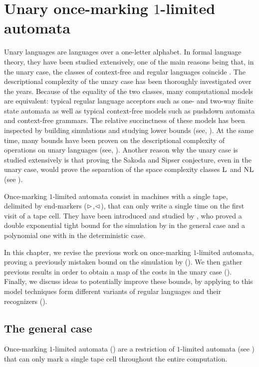 \chapter{Unary once-marking \texorpdfstring{$1$}{1}-limited automata}
Unary languages are languages over a one-letter alphabet.
In formal language theory, they have been studied extensively, one of the main reasons being that, in the unary case, the classes of context-free and regular languages coincide \cite{GinRic62}.
The descriptional complexity of the unary case has been thoroughly investigated over the years.
Because of the equality of the two classes, many computational models are equivalent: typical regular language acceptors such as one- and two-way finite state automata as well as typical context-free models such as pushdown automata and context-free grammars.
The relative succinctness of these models has been inspected by building simulations and studying lower bounds (see, \eg[,] \cite{GefMer+03,MerPig01,Pig08,PigSha+02}).
At the same time, many bounds have been proven on the descriptional complexity of operations on unary languages (see, \eg[,] \cite{HolKut03,KunOkh12,MerPig05,PigSha02}).
Another reason why the unary case is studied extensively is that proving the Sakoda and Sipser conjecture, even in the unary case, would prove the separation of the space complexity classes $\textsc{L}$ and $\textsc{NL}$ (see ).

Once-marking $1$-limited automata consist in machines with a single tape, delimited by end-markers ($\rhd$,$\lhd$), that can only write a single time on the first visit of a tape cell.
They have been introduced and studied by \citeauthor{PigPri23a}, who proved a double exponential tight bound for the simulation by \ODFAs in the general case and a polynomial one with \TDFA in the deterministic case.

In this chapter, we revise the previous work on once-marking $1$-limited automata, proving a previously mistaken bound on the simulation by \NFA ().
We then gather previous results in order to obtain a map of the costs in the unary case ().
Finally, we discuss ideas to potentially improve these bounds, by applying to this model techniques form different variants of regular languages and their recognizers ().



\section{The general case}\label{sec:oncemarking-general}
Once-marking $1$-limited automata (\OMOLA) are a restriction of $1$-limited automata (see ) that can only mark a single tape cell throughout the entire computation.

